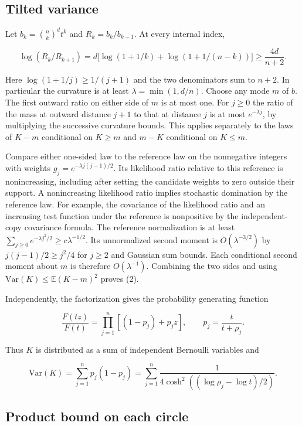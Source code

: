 \documentclass[11pt]{article}
\begin{document}
\subsection{Tilted variance}

Let $b_k=\binom nk^d t^k$ and $R_k=b_k/b_{k-1}$. At every internal index,

\[
\log(R_k/R_{k+1})
=d\bigl[\log(1+1/k)+\log(1+1/(n-k))\bigr]
\ge \frac{4d}{n+2}.
\]

Here $\log(1+1/j)\ge1/(j+1)$ and the two denominators sum to $n+2$. In particular the curvature is at least $\lambda=\min(1,d/n)$. Choose any mode $m$ of $b$. The first outward ratio on either side of $m$ is at most one. For $j\ge0$ the ratio of the mass at outward distance $j+1$ to that at distance $j$ is at most $e^{-\lambda j}$, by multiplying the successive curvature bounds. This applies separately to the laws of $K-m$ conditional on $K\ge m$ and $m-K$ conditional on $K\le m$.

Compare either one-sided law to the reference law on the nonnegative integers with weights $g_j=e^{-\lambda j(j-1)/2}$. Its likelihood ratio relative to this reference is nonincreasing, including after setting the candidate weights to zero outside their support. A nonincreasing likelihood ratio implies stochastic domination by the reference law. For example, the covariance of the likelihood ratio and an increasing test function under the reference is nonpositive by the independent-copy covariance formula. The reference normalization is at least $\sum_{j\ge0}e^{-\lambda j^2/2}\ge c\lambda^{-1/2}$. Its unnormalized second moment is $O(\lambda^{-3/2})$ by $j(j-1)/2\ge j^2/4$ for $j\ge2$ and Gaussian sum bounds. Each conditional second moment about $m$ is therefore $O(\lambda^{-1})$. Combining the two sides and using $\mathrm{Var}(K)\le\mathbb E(K-m)^2$ proves (2).

Independently, the factorization gives the probability generating function

\[
\frac{F(tz)}{F(t)}=
\prod_{j=1}^n\left[(1-p_j)+p_jz\right],
\qquad p_j=\frac{t}{t+\rho_j}.
\]

Thus $K$ is distributed as a sum of independent Bernoulli variables and

\[
\mathrm{Var}(K)=\sum_{j=1}^n p_j(1-p_j)
=\sum_{j=1}^n\frac{1}{4\cosh^2((\log\rho_j-\log t)/2)}.
\tag{4}
\]

\subsection{Product bound on each circle}
\end{document}
